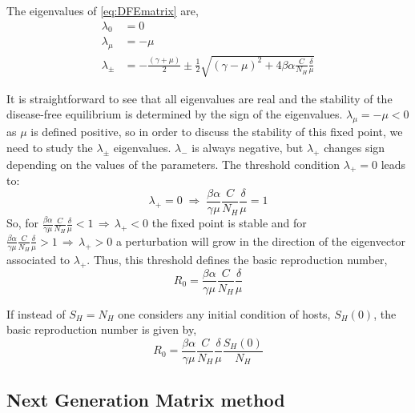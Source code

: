 The eigenvalues of \cref{eq:DFEmatrix} are,
\begin{equation}
    \begin{split}
        \lambda_0 &= 0 \\
        \lambda_\mu &= -\mu \\
        \lambda_{\pm} &= -\frac{(\gamma+\mu)}{2} \pm
        \frac{1}{2}\sqrt{ (\gamma-\mu)^2 +4\beta \alpha
            \frac{C}{N_H}\frac{\delta}{\mu}
        }
    \end{split}
\end{equation}

It is straightforward to see that all eigenvalues are real and
the stability of the disease-free equilibrium is determined by the sign of the
eigenvalues. $\lambda_\mu = -\mu <0$ as $\mu$ is defined positive, so  in order
to discuss the stability of this fixed point, we need to study the
$\lambda_{\pm}$ eigenvalues. $\lambda_{-}$ is always negative, but
$\lambda_{+}$ changes sign depending on the values of the parameters. The
threshold condition $\lambda_{+} = 0$ leads to:
\begin{equation}
    \lambda_{+} = 0 \; \Rightarrow \; \frac{\beta
        \alpha}{\gamma \mu} \frac{C}{N_H}\frac{\delta}{\mu} = 1
    \label{eq:lambda+_general}
\end{equation}
So, for $\displaystyle\frac{\beta \alpha}{\gamma \mu}
    \frac{C}{N_H}\frac{\delta}{\mu}<1 \, \Rightarrow \, \lambda_{+} < 0 $ the
fixed
point is stable and for $\displaystyle\frac{\beta \alpha}{\gamma \mu}
    \frac{C}{N_H}\frac{\delta}{\mu} >1 \, \Rightarrow \, \lambda_{+} > 0 $ a
perturbation will grow in the direction of the eigenvector associated to
$\lambda_{+}$. Thus, this threshold defines the basic reproduction number,
\begin{equation}
    R_0 = \frac{\beta \alpha}{\gamma
        \mu}\frac{C}{N_H}\frac{\delta}{\mu}
\end{equation}

If instead of $S_H=N_H$ one considers any initial condition of
hosts, $S_H(0)$, the basic reproduction number is given by,
\begin{equation}
    R_0 = \frac{\beta \alpha}{\gamma
        \mu}\frac{C}{N_H}\frac{\delta}{\mu}\frac{S_H(0)}{N_H}
\end{equation}

\subsection*{Next Generation Matrix method}

